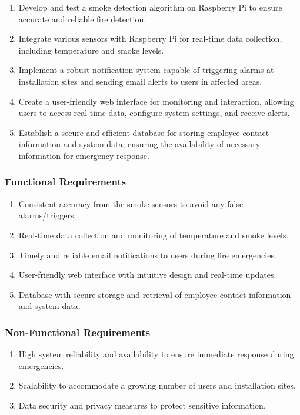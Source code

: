 \begin{enumerate}
    \item Develop and test a smoke detection algorithm on Raspberry Pi to ensure accurate and reliable fire detection.

    \item Integrate various sensors with Raspberry Pi for real-time data collection, including temperature and smoke levels.

    \item Implement a robust notification system capable of triggering alarms at installation sites and sending email alerts to
          users in affected areas.

    \item Create a user-friendly web interface for monitoring and interaction, allowing users to access real-time data, configure
          system settings, and receive alerts.

    \item Establish a secure and efficient database for storing employee contact information and system data, ensuring the
          availability of necessary information for emergency response.
\end{enumerate}

\subsubsection{Functional Requirements}

\begin{enumerate}
    \item Consistent accuracy from the smoke sensors to avoid any false alarms/triggers.

    \item Real-time data collection and monitoring of temperature and smoke levels.

    \item Timely and reliable email notifications to users during fire emergencies.

    \item User-friendly web interface with intuitive design and real-time updates.

    \item Database with secure storage and retrieval of employee contact information and system data.
\end{enumerate}

\subsubsection{Non-Functional Requirements}

\begin{enumerate}
    \item High system reliability and availability to ensure immediate response during emergencies.

    \item Scalability to accommodate a growing number of users and installation sites.

    \item Data security and privacy measures to protect sensitive information.
\end{enumerate}

